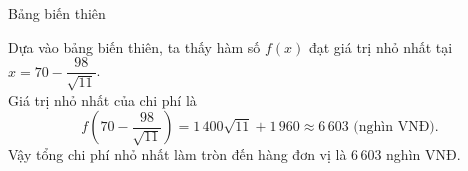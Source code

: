 \begin{ex}
{		Bảng biến thiên
		\begin{center}
		\end{center}
		Dựa vào bảng biến thiên, ta thấy hàm số $f(x)$ đạt giá trị nhỏ nhất tại $x = 70 - \dfrac{98}{\sqrt{11}}$.\\
		Giá trị nhỏ nhất của chi phí là
		\[f\left(70 - \dfrac{98}{\sqrt{11}}\right) = 1\,400\sqrt{11} + 1\,960 \approx 6\,603 \text{ (nghìn VNĐ)}.\]
		Vậy tổng chi phí nhỏ nhất làm tròn đến hàng đơn vị là $6\,603$ nghìn VNĐ.
	}
\end{ex}

